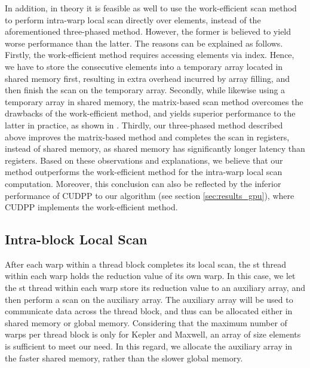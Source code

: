 \documentclass[article]{elsarticle}
\renewcommand{\hl}[1]{#1}
\begin{document}
{\hl{In addition, in theory it is feasible as well to use the work-efficient scan method to perform intra-warp local scan directly over  elements, instead of the aforementioned three-phased method. However, the former is believed to yield worse performance than the latter. The reasons can be explained as follows. Firstly, the work-efficient method requires accessing elements via index. Hence, we have to store the  consecutive elements into a temporary array located in shared memory first, resulting in extra overhead incurred by array filling, and then finish the scan on the temporary array. Secondly, while likewise using a temporary array in shared memory, the matrix-based scan method overcomes the drawbacks of the work-efficient method, and yields superior performance to the latter in practice, as shown in \cite{dotsenko2008fast}. Thirdly, our three-phased method described above improves the matrix-based method and completes the scan in registers, instead of shared memory, as shared memory has significantly longer latency than registers. Based on these observations and explanations, we believe that our method outperforms the work-efficient method for the intra-warp local scan computation. Moreover, this conclusion can also be reflected by the inferior performance of CUDPP to our algorithm (see section \ref{sec:results_gpu}), where CUDPP implements the work-efficient method.}
\subsection{Intra-block Local Scan}
After each warp within a thread block completes its local scan, the st  thread within each warp holds the reduction value of its own warp. In this case, we let the st thread within each warp store its reduction value to an auxiliary array, and then perform a scan on the auxiliary array. The auxiliary array will be used to communicate data across the thread block, and thus can be allocated either in shared memory or global memory. Considering that the maximum number of warps per thread block is only  for Kepler and Maxwell, an array of size  elements is sufficient to meet our need. In this regard, we allocate the auxiliary array in the faster shared memory, rather than the slower global memory.

}
\end{document}
